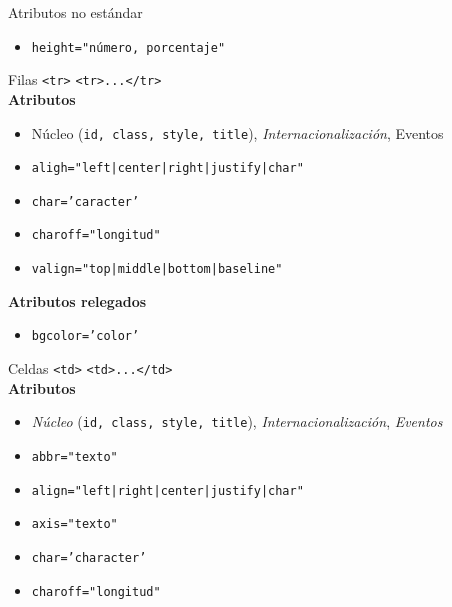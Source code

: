\documentclass{beamer}
\begin{document}
\begin{frame}{Atributos no estándar} %
    \begin{center}
        \begin{itemize}
            \item \texttt{height="número, porcentaje"}
        \end{itemize}
    \end{center}
\end{frame}

\begin{frame}{Filas \texttt{<tr>}} %
    \texttt{<tr>...</tr>}\\[0.5cm]
    \pause
    \textbf{Atributos}
    \begin{itemize}
        \item Núcleo (\texttt{id, class, style, title}),
        \textit{Internacionalización}, Eventos
        \item \texttt{aligh="left|center|right|justify|char"}
        \item \texttt{char='caracter'}
        \item \texttt{charoff="longitud"}
        \item \texttt{valign="top|middle|bottom|baseline"}
    \end{itemize}
    \pause 
    \textbf{Atributos relegados}
    \begin{itemize}
        \item \texttt{bgcolor='color'}
    \end{itemize}
\end{frame}

\begin{frame}{Celdas \texttt{<td>}} %
        \texttt{<td>...</td>}\\
        \textbf{Atributos}
        {\footnotesize 
        \begin{itemize}
            \item \textit{Núcleo} (\texttt{id, class, style, title}), \textit{Internacionalización}, \textit{Eventos}
            \item \texttt{abbr="texto"}
            \item \texttt{align="left|right|center|justify|char"}
            \item \texttt{axis="texto"}
            \item \texttt{char='character'}
            \item \texttt{charoff="longitud"}
        \end{itemize}
        }
\end{frame}
\end{document}

